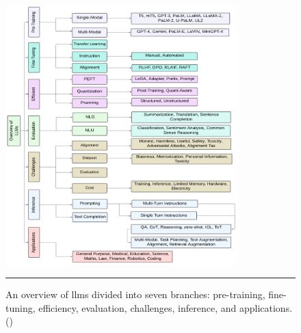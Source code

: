 \begin{figure}[htbp]
    \centering
 \includegraphics[width=0.8\textwidth]{figures/literature-review/llms-overview.png}
     \rule{35em}{0.5pt}
    \caption{An overview of \glspl{llm} divided into seven branches: pre-training, fine-tuning, efficiency, evaluation, challenges, inference, and applications. (\textcite{Naveed2023})}
 \label{fig:llms-overview}
\end{figure}

